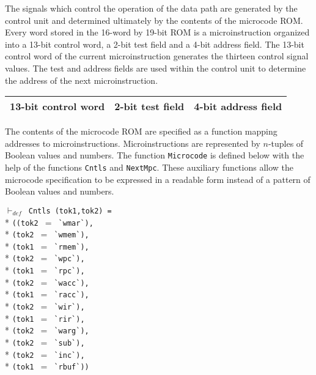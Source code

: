 \begin{normalsize}
The signals which control the operation of the data path are generated
by the control unit and determined ultimately by the contents of the
microcode ROM.
Every word stored in the 16-word by 19-bit ROM is a microinstruction
organized into a 13-bit control word, a 2-bit test field and a 4-bit
address field.
The 13-bit control word of the current microinstruction generates
the thirteen control signal values.  The test and
address fields are used within the control unit to determine the
address of the next microinstruction.

\begin{center}
\begin{tabular}{||c|c|c||} \hline
  13-bit control word& 2-bit test field& 4-bit address field\\ \hline
\end{tabular}
\end{center}

The contents of the microcode ROM are specified as a function
mapping addresses to microinstructions.  Microinstructions
are represented by $n$-tuples of Boolean values and numbers.
The function \verb"Microcode" is defined below with the help of
the functions \verb"Cntls" and \verb"NextMpc".  These auxiliary
functions allow the microcode specification to be expressed
in a readable form instead of a pattern of Boolean values and numbers.

\hspace*{\fill}
\begin{minipage}{17cm}
$\vdash_{def}$\verb" Cntls (tok1,tok2) ="\\*
\verb"((tok2 "$=$\verb" `wmar`),"\\*
\verb"(tok2 "$=$\verb" `wmem`),"\\*
\verb"(tok1 "$=$\verb" `rmem`),"\\*
\verb"(tok2 "$=$\verb" `wpc`),"\\*
\verb"(tok1 "$=$\verb" `rpc`),"\\*
\verb"(tok2 "$=$\verb" `wacc`),"\\*
\verb"(tok1 "$=$\verb" `racc`),"\\*
\verb"(tok2 "$=$\verb" `wir`),"\\*
\verb"(tok1 "$=$\verb" `rir`),"\\*
\verb"(tok2 "$=$\verb" `warg`),"\\*
\verb"(tok2 "$=$\verb" `sub`),"\\*
\verb"(tok2 "$=$\verb" `inc`),"\\*
\verb"(tok1 "$=$\verb" `rbuf`))"
\end{minipage}
\hspace*{\fill}


\end{normalsize}
